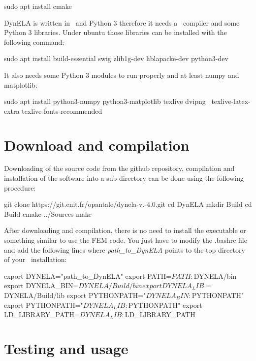 \begin{BashListing}[numbers=none]
sudo apt install cmake
\end{BashListing}

DynELA is written in \Cpp~and Python 3 therefore it needs a \Cpp~compiler and some Python 3 libraries. Under ubuntu those libraries can be installed with the following command:

\begin{BashListing}[numbers=none]
sudo apt install build-essential swig zlib1g-dev liblapacke-dev python3-dev
\end{BashListing}

It also needs some Python 3 modules to run properly and at least numpy and matplotlib:

\begin{BashListing}[numbers=none]
sudo apt install python3-numpy python3-matplotlib texlive dvipng \
texlive-latex-extra texlive-fonts-recommended
\end{BashListing}

\section{Download and compilation}

Downloading of the source code from the github repository, compilation and installation of the software into a sub-directory can be done using the following procedure:

\begin{BashListing}[numbers=none]
git clone https://git.enit.fr/opantale/dynela-v.-4.0.git
cd DynELA
mkdir Build
cd Build
cmake ../Sources
make
\end{BashListing}

After downloading and compilation, there is no need to install the executable or something similar to use the FEM code. You just have to modify the \textsf{.bashrc} file and add the following lines where \emph{path\_to\_DynELA} points to the top directory of your \DynELA~installation:

\begin{BashListing}[numbers=none]
export DYNELA="path_to_DynELA"
export PATH=$PATH:$DYNELA/bin
export DYNELA_BIN=$DYNELA/Build/bin
export DYNELA_LIB=$DYNELA/Build/lib
export PYTHONPATH="$DYNELA_BIN:$PYTHONPATH"
export PYTHONPATH="$DYNELA_LIB:$PYTHONPATH"
export LD_LIBRARY_PATH=$DYNELA_LIB:$LD_LIBRARY_PATH
\end{BashListing}

\section{Testing and usage}

